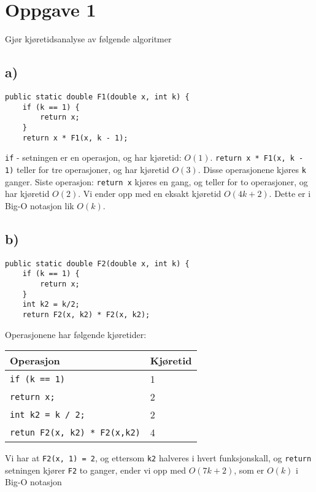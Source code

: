 \documentclass{article}
\begin{document}
    \section{Oppgave 1}
    Gjør kjøretidsanalyse av følgende algoritmer

    \subsection{a)}
    \begin{lstlisting}
public static double F1(double x, int k) {
    if (k == 1) {
        return x;    
    }
    return x * F1(x, k - 1);
    \end{lstlisting}

    \begin{ans}
        \texttt{if} - setningen er en operasjon, og har kjøretid: \( O(1) \). \texttt{return x * F1(x, k - 1)} teller for tre operasjoner, og har kjøretid \( O(3) \). Disse operasjonene kjøres \texttt{k} ganger. Siste operasjon: \texttt{return x} kjøres en gang, og teller for to operasjoner, og har kjøretid \( O(2) \). Vi ender opp med en eksakt kjøretid \( O(4k + 2) \). Dette er i Big-O notasjon lik \( O(k) \).

    \end{ans}

    \subsection{b)}

    \begin{lstlisting}
public static double F2(double x, int k) {
    if (k == 1) {
        return x;    
    }
    int k2 = k/2;
    return F2(x, k2) * F2(x, k2);
    \end{lstlisting}

    \begin{ans}
        Operasjonene har følgende kjøretider:

        \begin{table}[H]
            \begin{center}
                \begin{tabular}[c]{|l|l|}
                    \hline
                    Operasjon & Kjøretid  \\
                    \hline
                     \texttt{if (k == 1)}& 1  \\
                     \texttt{return x;} & 2  \\
                     \texttt{int k2 = k / 2;}& 2 \\
                     \texttt{retun F2(x, k2) * F2(x,k2)}& 4  \\
                    \hline
                \end{tabular}
            \end{center}
        \end{table}
    
        Vi har at \texttt{F2(x, 1) = 2}, og ettersom \texttt{k2} halveres i hvert funksjonskall, og \texttt{return} setningen kjører \texttt{F2} to ganger, ender vi opp med \( O(7k + 2) \), som er \( O(k) \) i Big-O notasjon
    \end{ans}
\end{document}
